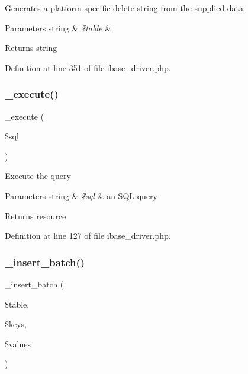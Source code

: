 Generates a platform-\/specific delete string from the supplied data


\begin{DoxyParams}[1]{Parameters}
string & {\em \$table} & \\
\hline
\end{DoxyParams}
\begin{DoxyReturn}{Returns}
string 
\end{DoxyReturn}


Definition at line 351 of file ibase\+\_\+driver.\+php.

\mbox{\label{class_c_i___d_b__ibase__driver_a114ab675d89bf8324a41785fb475e86d}} 
\subsubsection{\texorpdfstring{\_execute()}{\_execute()}}
{\footnotesize\ttfamily \+\_\+execute (\begin{DoxyParamCaption}\item[{}]{\$sql }\end{DoxyParamCaption})\hspace{0.3cm}{\ttfamily [protected]}}

Execute the query


\begin{DoxyParams}[1]{Parameters}
string & {\em \$sql} & an S\+QL query \\
\hline
\end{DoxyParams}
\begin{DoxyReturn}{Returns}
resource 
\end{DoxyReturn}


Definition at line 127 of file ibase\+\_\+driver.\+php.

\mbox{\label{class_c_i___d_b__ibase__driver_a1978e1358c812587a46e242630365099}} 
\subsubsection{\texorpdfstring{\_insert\_batch()}{\_insert\_batch()}}
{\footnotesize\ttfamily \+\_\+insert\+\_\+batch (\begin{DoxyParamCaption}\item[{}]{\$table,  }\item[{}]{\$keys,  }\item[{}]{\$values }\end{DoxyParamCaption})\hspace{0.3cm}{\ttfamily [protected]}}

